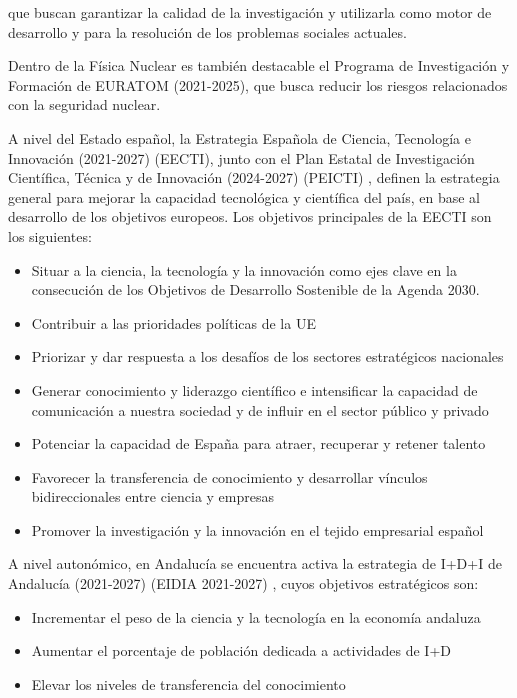 \documentclass[a4paper,12pt,twoside]{article}
\begin{document}
que buscan garantizar la calidad de la investigación y utilizarla como motor de desarrollo y para la resolución de los problemas sociales actuales.

Dentro de la Física Nuclear es también destacable el Programa de Investigación y Formación de
EURATOM (2021-2025), que busca reducir los riesgos relacionados con la seguridad nuclear.

A nivel del Estado español, la Estrategia Española de Ciencia, Tecnología e Innovación (2021-2027) (EECTI)\cite{eecti}, junto con el Plan Estatal de Investigación
Científica, Técnica y de Innovación (2024-2027) (PEICTI) \cite{peicti}, definen la estrategia general para mejorar la capacidad tecnológica y científica del país, en base al desarrollo de los objetivos europeos. Los objetivos principales de la EECTI son los siguientes:

\begin{itemize}
\item Situar a la ciencia, la tecnología y la innovación como ejes clave en la consecución de los Objetivos de Desarrollo Sostenible de la Agenda 2030.
\item Contribuir a las prioridades políticas de la UE
\item Priorizar y dar respuesta a los desafíos de los sectores estratégicos nacionales
\item Generar conocimiento y liderazgo científico e intensificar la capacidad de comunicación a nuestra sociedad y de influir en el sector público y privado
\item Potenciar la capacidad de España para atraer, recuperar y retener talento
\item Favorecer la transferencia de conocimiento y desarrollar vínculos bidireccionales entre
ciencia y empresas
\item Promover la investigación y la innovación en el tejido empresarial español
\end{itemize}

A nivel autonómico, en Andalucía se encuentra activa la estrategia de I+D+I de Andalucía (2021-2027) (EIDIA 2021-2027) \cite{eidia}, cuyos objetivos estratégicos son:

\begin{itemize}
\item Incrementar el peso de la ciencia y la tecnología en la economía andaluza
\item Aumentar el porcentaje de población dedicada a actividades de I+D
\item Elevar los niveles de transferencia del conocimiento
\end{itemize}
\end{document}
